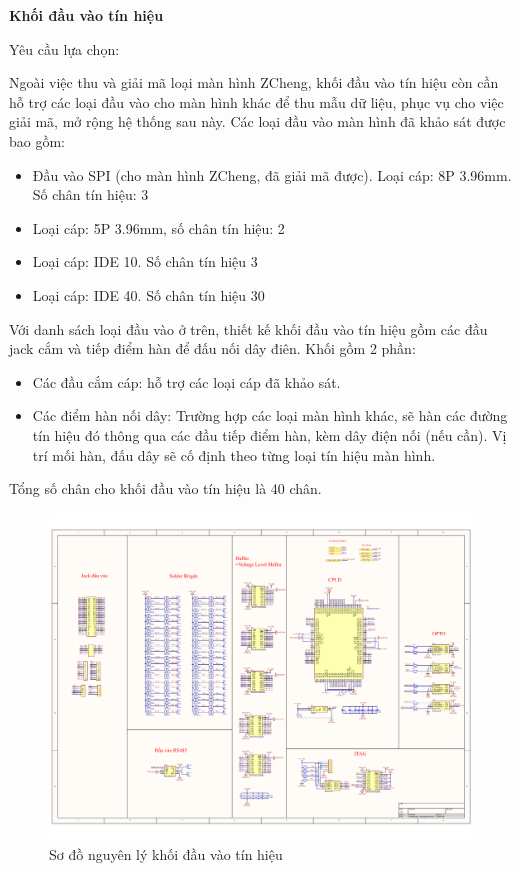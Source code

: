 \textbf{Khối đầu vào tín hiệu}


 Yêu cầu lựa chọn: 

Ngoài việc thu và giải mã loại màn hình ZCheng, khối đầu vào tín hiệu còn cần hỗ trợ các loại đầu vào cho màn hình khác để thu mẫu dữ liệu, phục vụ cho việc giải mã, mở rộng hệ thống sau này. Các loại đầu vào màn hình đã khảo sát được bao gồm:

\begin{itemize}
    \item Đầu vào SPI (cho màn hình ZCheng, đã giải mã được). Loại cáp: 8P 3.96mm. Số chân tín hiệu: 3
    \item Loại cáp: 5P 3.96mm, số chân tín hiệu: 2
    \item Loại cáp: IDE 10. Số chân tín hiệu 3
    \item Loại cáp: IDE 40. Số chân tín hiệu 30
\end{itemize}

Với danh sách loại đầu vào ở trên, thiết kế khối đầu vào tín hiệu gồm các đầu jack cắm và tiếp điểm hàn để đấu nối dây điên. Khối gồm 2 phần: 

\begin{itemize}
    \item Các đầu cắm cáp: hỗ trợ các loại cáp đã khảo sát.
    \item Các điểm hàn nối dây: Trường hợp các loại màn hình khác, sẽ hàn các đường tín hiệu đó thông qua các đầu tiếp điểm hàn, kèm dây điện nối (nếu cần). Vị trí mối hàn, đấu dây sẽ cố định theo từng loại tín hiệu màn hình.
\end{itemize}

Tổng số chân cho khối đầu vào tín hiệu là 40 chân.

\begin{figure}[!ht]
    \centering
    \includegraphics[width=1.0\linewidth]{Figures/Chap3_Input-signal-block-principle.pdf}
    \caption{Sơ đồ nguyên lý khối đầu vào tín hiệu}
    \label{fig:hinh3.6}
\end{figure}



